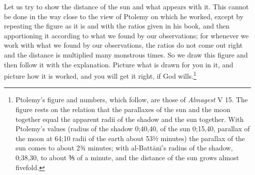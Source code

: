 \documentclass[11pt]{article}
\begin{document}
\par Let us try to show the distance of the sun and what appears with it. This cannot be done in the way close to the view of Ptolemy on which he worked, except by repeating the figure as it is and with the ratios given in his book, and then apportioning it according to what we found by our observations; for whenever we work with what we found by our observations, the ratios do not come out right and the distance is multiplied many monstrous times. So we draw this figure and then follow it with the explanation. Picture what is drawn for you in it, and picture how it is worked, and you will get it right, if God wills.\footnote{Ptolemy's figure and numbers, which follow, are those of \emph{Almagest} V 15. The figure rests on the relation that the parallaxes of the sun and the moon together equal the apparent radii of the shadow and the sun together. With Ptolemy's values (radius of the shadow 0;40,40, of the sun 0;15,40, parallax of the moon at 64;10 radii of the earth about 53½ minutes) the parallax of the sun comes to about 2¾ minutes; with al-Battānī's radius of the shadow, 0;38,30, to about ⅗ of a minute, and the distance of the sun grows almost fivefold.}\par
\end{document}
